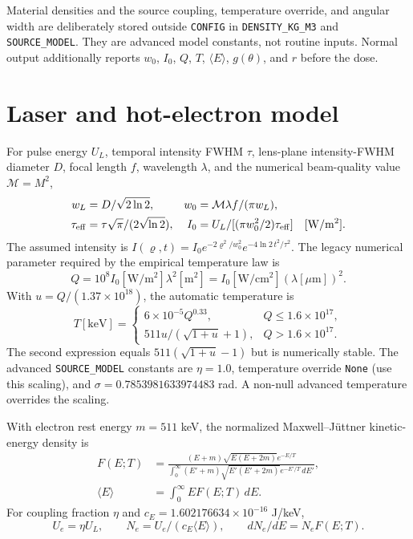 \documentclass[10pt,a4paper]{article}
\begin{document}
Material densities and the source coupling, temperature override, and angular width are deliberately stored outside \texttt{CONFIG} in \texttt{DENSITY\_KG\_M3} and \texttt{SOURCE\_MODEL}. They are advanced model constants, not routine inputs. Normal output additionally reports $w_0$, $I_0$, $Q$, $T$, $\langle E\rangle$, $g(\theta)$, and $r$ before the dose.

\section{Laser and hot-electron model}
For pulse energy $U_L$, temporal intensity FWHM $\tau$, lens-plane intensity-FWHM diameter $D$, focal length $f$, wavelength $\lambda$, and the numerical beam-quality value $\mathcal M=M^2$,
\begin{align}
w_L&=D/\sqrt{2\ln2},&w_0&=\mathcal M\lambda f/(\pi w_L),\\
\tau_{\rm eff}&=\tau\sqrt\pi/(2\sqrt{\ln2}),&
I_0&=U_L/[(\pi w_0^2/2)\tau_{\rm eff}]\quad[\mathrm{W/m^2}].
\end{align}
The assumed intensity is $I(\varrho,t)=I_0e^{-2\varrho^2/w_0^2}e^{-4\ln2\,t^2/\tau^2}$. The legacy numerical parameter required by the empirical temperature law is
\begin{equation}
Q=10^8 I_0[\mathrm{W/m^2}]\lambda^2[\mathrm m^2]
=I_0[\mathrm{W/cm^2}](\lambda[\mu\mathrm m])^2.
\end{equation}
With $u=Q/(1.37\times10^{18})$, the automatic temperature is \cite{liang}
\begin{equation}
T[\mathrm{keV}]=\begin{cases}6\times10^{-5}Q^{0.33},&Q\leq1.6\times10^{17},\\
511u/(\sqrt{1+u}+1),&Q>1.6\times10^{17}.
\end{cases}
\end{equation}
The second expression equals $511(\sqrt{1+u}-1)$ but is numerically stable. The advanced \texttt{SOURCE\_MODEL} constants are $\eta=1.0$, temperature override \texttt{None} (use this scaling), and $\sigma=0.7853981633974483$ rad. A non-null advanced temperature overrides the scaling.

With electron rest energy $m=511$ keV, the normalized Maxwell--J\"uttner kinetic-energy density is \cite{juttner}
\begin{align}
F(E;T)&=\frac{(E+m)\sqrt{E(E+2m)}e^{-E/T}}
{\int_0^\infty(E'+m)\sqrt{E'(E'+2m)}e^{-E'/T}\,dE'},\\
\langle E\rangle&=\int_0^\infty EF(E;T)\,dE.
\end{align}
For coupling fraction $\eta$ and $c_E=1.602176634\times10^{-16}$ J/keV,
\begin{equation}U_e=\eta U_L,\qquad N_e=U_e/(c_E\langle E\rangle),\qquad dN_e/dE=N_eF(E;T).\end{equation}
\end{document}
